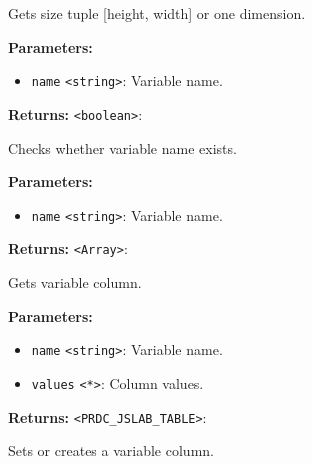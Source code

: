 \documentclass[12pt,a4paper]{article}
\begin{document}
\noindent Gets size tuple [height, width] or one dimension.

\vspace{5mm}
\noindent {}


\noindent \textbf{Parameters:}
\begin{itemize}
  \item \texttt{name} \texttt{<string>}: Variable name.
\end{itemize}

\noindent \textbf{Returns:} \texttt{<boolean>}:

\noindent Checks whether variable name exists.

\vspace{5mm}
\noindent {}


\noindent \textbf{Parameters:}
\begin{itemize}
  \item \texttt{name} \texttt{<string>}: Variable name.
\end{itemize}

\noindent \textbf{Returns:} \texttt{<Array>}:

\noindent Gets variable column.

\vspace{5mm}
\noindent {}


\noindent \textbf{Parameters:}
\begin{itemize}
  \item \texttt{name} \texttt{<string>}: Variable name.
  \item \texttt{values} \texttt{<*>}: Column values.
\end{itemize}

\noindent \textbf{Returns:} \texttt{<PRDC\_JSLAB\_TABLE>}:

\noindent Sets or creates a variable column.

\vspace{5mm}
\noindent {}
\end{document}
